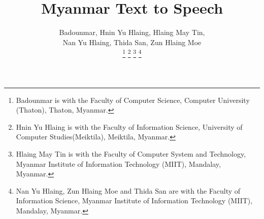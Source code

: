 \documentclass[journal,transmag]{JIISTjrnl}
\begin{document}
%
\title{Myanmar Text to Speech}
%
%


\author{Badounmar, Hnin Yu Hlaing, Hlaing May Tin, \\Nan Yu Hlaing, Thida San, Zun Hlaing Moe  
 
\thanks{Badounmar is with the Faculty of Computer Science, Computer University (Thaton), Thaton, Myanmar.}
\thanks{Hnin Yu Hlaing is with the Faculty of Information Science, University of Computer Studies(Meiktila), Meiktila, Myanmar.} 
\thanks{Hlaing May Tin is with the Faculty of Computer System and Technology, Myanmar Institute of Information Technology (MIIT), Mandalay, Myanmar.}      
\thanks{Nan Yu Hlaing, Zun Hlaing Moe and Thida San are with the Faculty of Information Science, Myanmar Institute of Information Technology (MIIT), Mandalay, Myanmar.}}


% 
%
\end{document}
